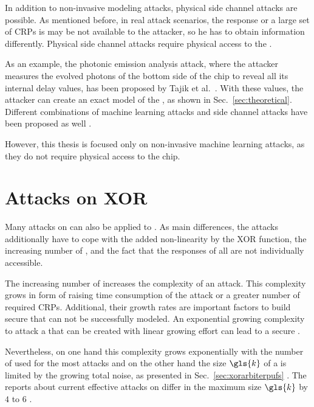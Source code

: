 In addition to non-invasive modeling attacks, physical side channel attacks are possible.
As mentioned before, in real attack scenarios, the \puf response or a large set of \acp{CRP} is may be not available to the attacker, so he has to obtain information differently.
Physical side channel attacks require physical access to the \puf. %

As an example, the photonic emission analysis attack, where the attacker measures the evolved photons of the bottom side of the \apuf chip to reveal all its internal delay values, has been proposed by Tajik et al.\ \cite{Tajik2014PhysicalPUFs}.
With these values, the attacker can create an exact model of the \apuf, as shown in Sec.\ \ref{sec:theoretical}. %
Different combinations of machine learning attacks and side channel attacks have been proposed as well \cite{Mahmoud2013CombinedPUFs, Xu2014Hybrid}.

However, this thesis is focused only on non-invasive machine learning attacks, as they do not require physical access to the \apuf chip.


\section{Attacks on \acs{XOR} \apufs}
\label{sec:attacksonxorarbiter}

Many attacks on \apufs can also be applied to \xpufs.
As main differences, the attacks additionally have to cope with the added non-linearity by the \ac{XOR} function, the increasing number of \apufs, and the fact that the responses of all \apufs are not individually accessible.

The increasing number of \apufs increases the complexity of an attack.
This complexity grows in form of raising time consumption of the attack or a greater number of required \acp{CRP}.
Additional, their growth rates are important factors to build secure \xpufs that can not be successfully modeled.
An exponential growing complexity to attack a \xpuf that can be created with linear growing effort can lead to a secure \puf.

Nevertheless, on one hand this complexity grows exponentially with the number of used \apufs for the most attacks and on the other hand the size $\gls{k}$ of a \xpuf is limited by the growing total noise, as presented in Sec.\ \ref{sec:xorarbiterpufs} \cite{Ruhrmair2010ModelingFunctions}. %
The reports about current effective attacks on \xpufs differ in the maximum size $\gls{k}$ by $4$ to $6$ \cite{Ganji2015WhyPUFs, Xu2014Hybrid}.

